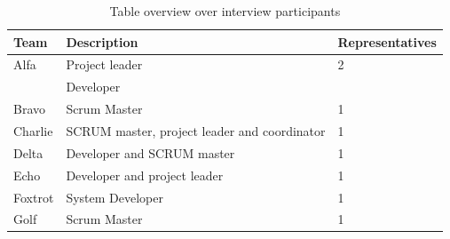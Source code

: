 \begin{table}[!h]
	\begin{center}
	\caption{Table overview over interview participants}
	\label{table:participants}
	\begin{tabular}{l p{} l}
	\hline
	Team & Description & Representatives\\
	\hline
	Alfa & Project leader & 2 \\
	& Developer & \\
	Bravo & Scrum Master & 1  \\
	Charlie & SCRUM master, project leader and coordinator & 1 \\
	Delta & Developer and SCRUM master & 1 \\
	Echo & Developer and project leader & 1 \\
	Foxtrot & System Developer & 1 \\
	Golf & Scrum Master & 1 \\
	\hline
	\end{tabular}
	\end{center}
\end{table}

\clearpage